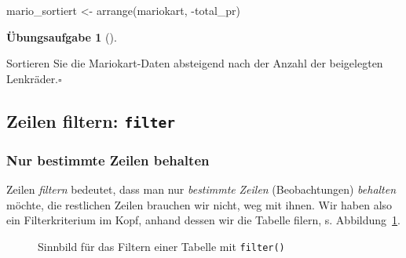 \documentclass[
  a4paper,
]{scrbook}
\newenvironment{Shaded}{\begin{snugshade}}{\end{snugshade}}
\newcommand{\FunctionTok}[1]{\textcolor[rgb]{0.28,0.35,0.67}{#1}}
\newcommand{\NormalTok}[1]{\textcolor[rgb]{0.00,0.23,0.31}{#1}}
\newcommand{\OtherTok}[1]{\textcolor[rgb]{0.00,0.23,0.31}{#1}}
\newcommand{\SpecialCharTok}[1]{\textcolor[rgb]{0.37,0.37,0.37}{#1}}
\theoremstyle{definition}
\theoremstyle{definition}
\theoremstyle{definition}
\newtheorem{exercise}{Übungsaufgabe}[chapter]
\theoremstyle{remark}
\begin{document}
\begin{Shaded}
\begin{Highlighting}[]
\NormalTok{mario\_sortiert }\OtherTok{\textless{}{-}} \FunctionTok{arrange}\NormalTok{(mariokart, }\SpecialCharTok{{-}}\NormalTok{total\_pr)}
\end{Highlighting}
\end{Shaded}

\begin{exercise}[]\protect\hypertarget{exr-arrange2}{}\label{exr-arrange2}

Sortieren Sie die Mariokart-Daten absteigend nach der Anzahl der
beigelegten Lenkräder.\(\square\)

\end{exercise}

\subsection{\texorpdfstring{Zeilen filtern:
\texttt{filter}}{Zeilen filtern: filter}}\label{zeilen-filtern-filter}

\subsubsection{Nur bestimmte Zeilen
behalten}\label{nur-bestimmte-zeilen-behalten}

Zeilen \emph{filtern} bedeutet, dass man nur \emph{bestimmte}
\emph{Zeilen} (Beobachtungen) \emph{behalten} möchte, die restlichen
Zeilen brauchen wir nicht, weg mit ihnen. Wir haben also ein
Filterkriterium im Kopf, anhand dessen wir die Tabelle filern, s.
Abbildung~\ref{fig-filter}.

\begin{figure}


\caption{\label{fig-filter}Sinnbild für das Filtern einer Tabelle mit
\texttt{filter()}}

\end{figure}%
\end{document}
